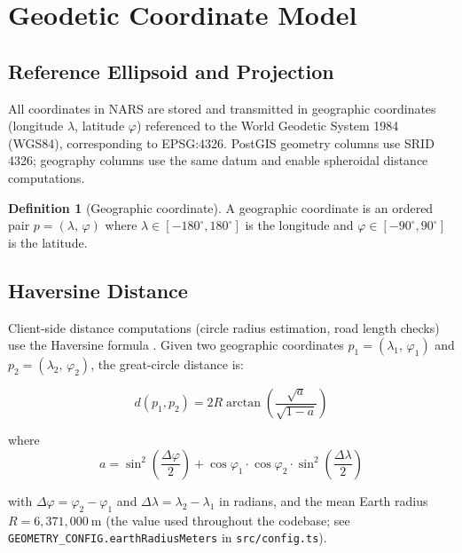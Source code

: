 \documentclass[12pt,a4paper]{article}
\theoremstyle{definition}
\newtheorem{definition}{Definition}[section]
\theoremstyle{plain}
\theoremstyle{remark}
\newcommand{\coord}[2]{(#1,\,#2)}
\begin{document}
\section{Geodetic Coordinate Model}
\label{sec:geodesy}

\subsection{Reference Ellipsoid and Projection}

All coordinates in NARS are stored and transmitted in geographic
coordinates (longitude $\lambda$, latitude $\varphi$) referenced to the
World Geodetic System 1984 (WGS84)\cite{wgs84}, corresponding to EPSG:4326. PostGIS
geometry columns use SRID 4326; geography columns use the same datum and
enable spheroidal distance computations.

\begin{definition}[Geographic coordinate]
A geographic coordinate is an ordered pair $p = \coord{\lambda}{\varphi}$
where $\lambda \in [-180^\circ, 180^\circ]$ is the longitude and
$\varphi \in [-90^\circ, 90^\circ]$ is the latitude.
\end{definition}

\subsection{Haversine Distance}

Client-side distance computations (circle radius estimation, road length
checks) use the Haversine formula \cite{haversine}. Given two geographic coordinates
$p_1 = \coord{\lambda_1}{\varphi_1}$ and $p_2 = \coord{\lambda_2}{\varphi_2}$,
the great-circle distance is:

\begin{equation}
  d(p_1, p_2) = 2 R \arctan\!\left(\frac{\sqrt{a}}{\sqrt{1 - a}}\right)
  \label{eq:haversine}
\end{equation}

where
\begin{equation}
  a = \sin^2\!\left(\frac{\Delta\varphi}{2}\right)
    + \cos\varphi_1 \cdot \cos\varphi_2 \cdot \sin^2\!\left(\frac{\Delta\lambda}{2}\right)
  \label{eq:haversine_a}
\end{equation}

with $\Delta\varphi = \varphi_2 - \varphi_1$ and
$\Delta\lambda = \lambda_2 - \lambda_1$ in radians, and the mean Earth
radius $R = 6{,}371{,}000\ \mathrm{m}$ (the value used throughout the
codebase; see \texttt{GEOMETRY\_CONFIG.\allowbreak earthRadiusMeters} in
\texttt{src/config.ts}).
\end{document}

